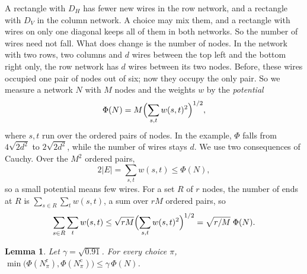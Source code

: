 \documentclass[11pt]{article}
\newtheorem{lemma}[theorem]{Lemma}
\begin{document}
A rectangle with $D_H$ has fewer new wires in the row network, and a rectangle with $D_V$ in the column network. A choice may mix them, and a rectangle with wires on only one diagonal keeps all of them in both networks. So the number of wires need not fall. What does change is the number of nodes. In the network with two rows, two columns and $d$ wires between the top left and the bottom right only, the row network has $d$ wires between its two nodes. Before, these wires occupied one pair of nodes out of six; now they occupy the only pair. So we measure a network $N$ with $M$ nodes and the weights $w$ by the \emph{potential}
\[
\Phi(N)=M\Bigl(\sum_{s,t}w(s,t)^2\Bigr)^{1/2},
\]
where $s,t$ run over the ordered pairs of nodes. In the example, $\Phi$ falls from $4\sqrt{2d^2}$ to $2\sqrt{2d^2}$, while the number of wires stays $d$. We use two consequences of Cauchy. Over the $M^2$ ordered pairs,
\begin{equation}\label{ends}
2|E|=\sum_{s,t}w(s,t)\le\Phi(N),
\end{equation}
so a small potential means few wires. For a set $R$ of $r$ nodes, the number of ends at $R$ is $\sum_{s\in R}\sum_tw(s,t)$, a sum over $rM$ ordered pairs, so
\begin{equation}\label{rowends}
\sum_{s\in R}\sum_tw(s,t)\le\sqrt{rM}\Bigl(\sum_{s,t}w(s,t)^2\Bigr)^{1/2}=\sqrt{r/M}\;\Phi(N).
\end{equation}

\begin{lemma}\label{lem:phi}
Let $\gamma=\sqrt{0.91}$. For every choice $\pi$, $\min\bigl(\Phi(N^{\mathrm r}_\pi),\Phi(N^{\mathrm c}_\pi)\bigr)\le\gamma\,\Phi(N)$.
\end{lemma}
\end{document}
